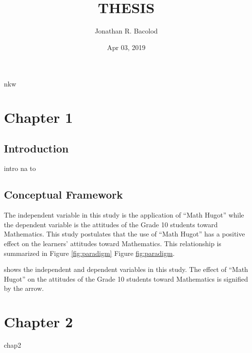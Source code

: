 \documentclass[]{article}
\title{THESIS}
\author{Jonathan R. Bacolod}
\date{Apr 03, 2019}
\let\oldsubparagraph\subparagraph
\renewcommand{\subparagraph}[1]{\oldsubparagraph{#1}\mbox{}}
\begin{document}
\maketitle

{
\setcounter{tocdepth}{2}
\tableofcontents
}
nkw

\FloatBarrier

\subparagraph{\texorpdfstring{\newpage}{}}\label{section}

\section{Chapter 1}\label{chapter-1}

\subsection{Introduction}\label{introduction}

intro na to

\subsection{Conceptual Framework}\label{conceptual-framework}

The independent variable in this study is the application of ``Math
Hugot'' while the dependent variable is the attitudes of the Grade 10
students toward Mathematics. This study postulates that the use of
``Math Hugot'' has a positive effect on the learners' attitudes toward
Mathematics. This relationship is summarized in Figure
\ref{fig:paradigm} Figure
\protect\hyperlink{fig:paradigm}{fig:paradigm}.

shows the independent and dependent variables in this study. The effect
of ``Math Hugot'' on the attitudes of the Grade 10 students toward
Mathematics is signified by the arrow.

\label{fig:paradigm} \FloatBarrier

\subparagraph{\texorpdfstring{\newpage}{}}\label{section-1}

\section{Chapter 2}\label{chapter-2}

chap2

\FloatBarrier

\subparagraph{\texorpdfstring{\newpage}{}}\label{section-2}

\FloatBarrier

\subparagraph{\texorpdfstring{\newpage}{}}\label{section-3}
\end{document}
